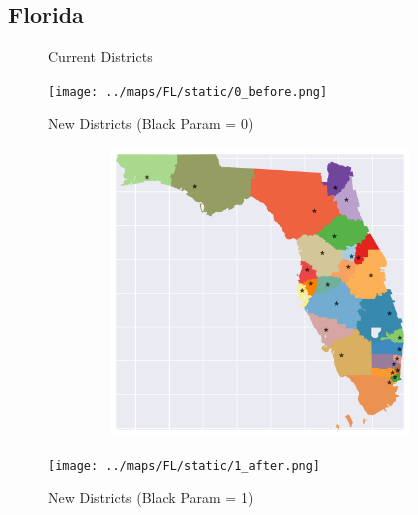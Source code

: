 \subsection{Florida}
\begin{figure}[htb!] \centering
\caption{ Current Districts }
\texttt{[image: ../maps/FL/static/0\_before.png]}
\caption{ New Districts (Black Param = 0) }
\includegraphics[width=5in,height=3in,keepaspectratio]{../maps/FL/static/0_after.png}
\caption{ New Districts (Black Param = 1) }
\texttt{[image: ../maps/FL/static/1\_after.png]}
\end{figure}

\clearpage
\newpage

